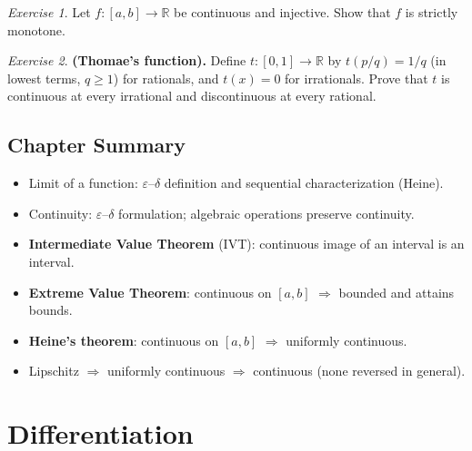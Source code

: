 \documentclass[12pt,a4paper,openany]{book}
\theoremstyle{definition}
\theoremstyle{remark}
\newtheorem{exercise}{Exercise}[chapter]
\begin{document}
\begin{exercise}\label{exo:ch5-11}
Let $f\colon[a,b]\to\mathbb{R}$ be continuous and injective.  Show that
$f$ is strictly monotone.
\end{exercise}

\begin{exercise}\label{exo:ch5-12}
\textbf{(Thomae's function).}\;
Define $t\colon[0,1]\to\mathbb{R}$ by $t(p/q)=1/q$ (in lowest terms,
$q\ge 1$) for rationals, and $t(x)=0$ for irrationals.  Prove that $t$
is continuous at every irrational and discontinuous at every rational.
\end{exercise}

\section*{Chapter Summary}

\begin{tcolorbox}[colback=gray!5,colframe=black!50,
  title={Key results of Chapter 5}]
\begin{itemize}[nosep]
\item Limit of a function: $\varepsilon$--$\delta$ definition and
  sequential characterization (Heine).
\item Continuity: $\varepsilon$--$\delta$ formulation;
  algebraic operations preserve continuity.
\item \textbf{Intermediate Value Theorem} (IVT): continuous image of
  an interval is an interval.
\item \textbf{Extreme Value Theorem}: continuous on $[a,b]$
  $\Rightarrow$ bounded and attains bounds.
\item \textbf{Heine's theorem}: continuous on $[a,b]$ $\Rightarrow$
  uniformly continuous.
\item Lipschitz $\Rightarrow$ uniformly continuous $\Rightarrow$
  continuous (none reversed in general).
\end{itemize}
\end{tcolorbox}


\chapter{Differentiation}\label{ch:differentiation}
\end{document}
